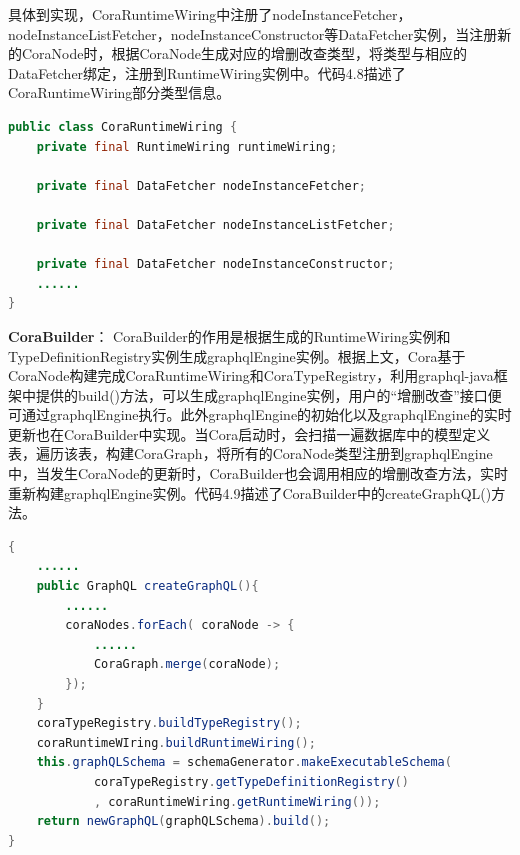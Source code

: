 \documentclass[winfonts,master,twoside]{njuthesis}
\begin{document}
具体到实现，CoraRuntimeWiring中注册了nodeInstanceFetcher，nodeInstanceListFetcher，nodeInstanceConstructor等DataFetcher实例，当注册新的CoraNode时，根据CoraNode生成对应的增删改查类型，将类型与相应的DataFetcher绑定，注册到RuntimeWiring实例中。代码4.8描述了CoraRuntimeWiring部分类型信息。
\begin{lstlisting}[caption={CoraRuntimeWiring类型信息},label={lst:CoraRuntimeWiring},language=java,basicstyle=\footnotesize]
public class CoraRuntimeWiring {
    private final RuntimeWiring runtimeWiring;    
    
    private final DataFetcher nodeInstanceFetcher;
    
    private final DataFetcher nodeInstanceListFetcher;
    
    private final DataFetcher nodeInstanceConstructor;
    ......
}
\end{lstlisting}

\textbf{CoraBuilder}：
CoraBuilder的作用是根据生成的RuntimeWiring实例和TypeDefinitionRegistry实例生成graphqlEngine实例。根据上文，Cora基于CoraNode构建完成CoraRuntimeWiring和CoraTypeRegistry，利用graphql-java框架中提供的build()方法，可以生成graphqlEngine实例，用户的“增删改查”接口便可通过graphqlEngine执行。此外graphqlEngine的初始化以及graphqlEngine的实时更新也在CoraBuilder中实现。当Cora启动时，会扫描一遍数据库中的模型定义表，遍历该表，构建CoraGraph，将所有的CoraNode类型注册到graphqlEngine中，当发生CoraNode的更新时，CoraBuilder也会调用相应的增删改查方法，实时重新构建graphqlEngine实例。代码4.9描述了CoraBuilder中的createGraphQL()方法。
\begin{lstlisting}[caption={CoraBuilder中的createGraphQL()方法},label={lst:createGraphQL()},language=java,basicstyle=\footnotesize]
{
    ......
    public GraphQL createGraphQL(){
        ......
        coraNodes.forEach( coraNode -> {
            ......
            CoraGraph.merge(coraNode);
        });
    }
    coraTypeRegistry.buildTypeRegistry();
    coraRuntimeWIring.buildRuntimeWiring();
    this.graphQLSchema = schemaGenerator.makeExecutableSchema(
            coraTypeRegistry.getTypeDefinitionRegistry()
            , coraRuntimeWiring.getRuntimeWiring());
    return newGraphQL(graphQLSchema).build();
}
\end{lstlisting}
\end{document}
